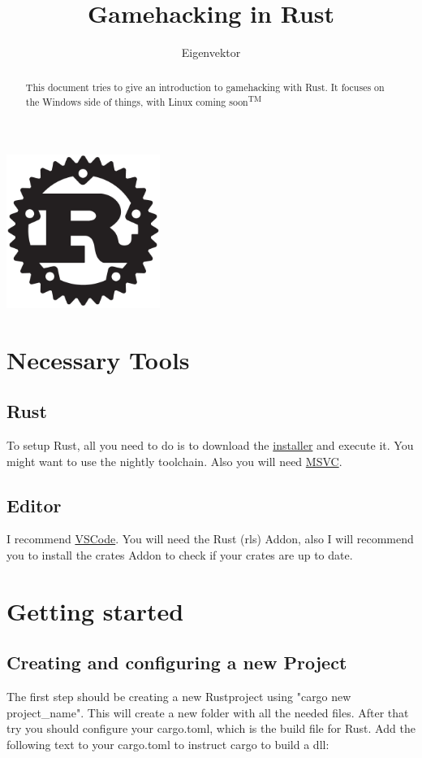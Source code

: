 \documentclass[]{scrartcl}
\title{Gamehacking in Rust}
\author{Eigenvektor}
\begin{document}
\maketitle

\begin{center}
\includegraphics[width=5cm, height=5cm]{rust.png}
\end{center}
\begin{abstract}
	\noindent
	This document tries to give an introduction to gamehacking with Rust. It focuses on the Windows side of things, with Linux coming soon\textsuperscript{TM}
\end{abstract}

\newpage

\section{Necessary Tools}
\subsection{Rust}
\noindent
To setup Rust, all you need to do is to download the \href{https://rustup.rs/}{installer} and execute it. You might want to use the nightly toolchain. Also you will need \href{https://visualstudio.microsoft.com/thank-you-downloading-visual-studio/?sku=BuildTools&rel=15}{MSVC}.

\subsection{Editor}
I recommend \href{https://code.visualstudio.com/}{VSCode}. You will need the Rust (rls) Addon, also I will recommend you to install the crates Addon to check if your crates are up to date.

\section{Getting started}
\subsection{Creating and configuring a new Project}
The first step should be creating a new Rustproject using "cargo new project\_name". This will create a new folder with all the needed files. After that try you should configure your cargo.toml, which is the build file for Rust. Add the following text to your cargo.toml to instruct cargo to build a dll:
\end{document}
